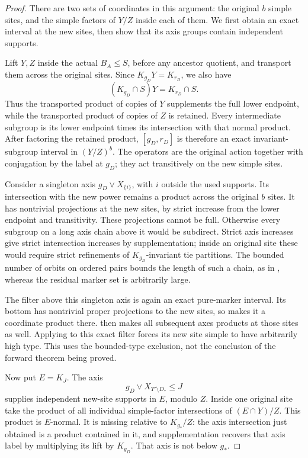 \begin{proof}

There are two sets of coordinates in this argument: the original \(b\)
simple sites, and the simple factors of \(Y/Z\) inside each of them.
We first obtain an exact interval at the new sites, then show that its
axis groups contain independent supports.

Lift \(Y,Z\) inside the actual \(B_A\le S\), before any ancestor
quotient, and transport them across the original sites.  Since
\(K_{g_D}Y=K_{r_D}\), we also have
\[
 (K_{g_D}\cap S)Y=K_{r_D}\cap S.
\]
Thus the transported product of copies of \(Y\) supplements the full
lower endpoint, while the transported product of copies of \(Z\)
is retained.  Every intermediate subgroup is its lower endpoint
times its intersection with that normal product.  After factoring
the retained product, \([g_D,r_D]\) is therefore an exact
invariant-subgroup interval in \((Y/Z)^b\).  The operators are the
original action together with conjugation by the label at \(g_D\);
they act transitively on the new simple sites.

Consider a singleton axis \(g_D\vee X_{\{i\}}\), with \(i\) outside
the used supports.  Its intersection with the new power remains a
product across the original \(b\) sites.  It has nontrivial projections
at the new sites, by strict increase from the lower endpoint and
transitivity.  These projections cannot be full.  Otherwise every
subgroup on a long axis chain above it would be subdirect.  Strict
axis increases give strict intersection increases by supplementation;
inside an original site these would require strict refinements of
\(K_{g_D}\)-invariant tie partitions.  The bounded number of orbits
on ordered pairs bounds the length of such a chain, as in
, whereas the residual marker set is arbitrarily
large.

The filter above this singleton axis is again an exact pure-marker
interval.  Its bottom has nontrivial proper projections to the new
sites, so  makes it a coordinate product there.
 then makes all subsequent axes products at those
sites as well.  Applying  to this exact filter
forces its new site simple to have arbitrarily high type.  This uses
the bounded-type exclusion, not the conclusion of the forward theorem
being proved.

Now put \(E=K_J\).  The axis
\[
 g_D\vee X_{T'\setminus D_*}\le J
\]
supplies independent new-site supports in \(E\), modulo \(Z\).
Inside one original site take the product of all individual
simple-factor intersections of \((E\cap Y)/Z\).  This product is
\(E\)-normal.  It is missing relative to \(K_{g_*}/Z\): the axis
intersection just obtained is a product contained in it, and
supplementation recovers that axis label by multiplying its lift by
\(K_{g_D}\).  That axis is not below \(g_*\).


\end{proof}
